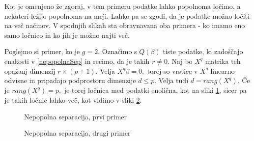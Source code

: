 \documentclass[12pt,a4paper]{amsart}
\theoremstyle{definition} %
\theoremstyle{plain} %
\begin{document}
Kot je omenjeno že zgoraj, v tem primeru podatke lahko popolnoma ločimo, a nekateri ležijo popolnoma na meji. Lahko pa se zgodi, da je podatke možno ločiti na več načinov. V spodnjih
slikah sta obravnavana oba primera - ko imamo eno samo ločnico in ko jih je možno najti več.

Poglejmo si primer, ko je $g=2$. Označimo s $Q(\beta)$ tiste podatke, ki zadoščajo enakosti v \eqref{nepopolnaSep} in recimo, da je takih $r \neq 0$. Naj bo 
$X^{q}$ matrika teh opažanj dimenzij $r\times(p+1).$ Velja $X^{q}\beta=0,$ torej so vrstice v $X^{q}$ linearno odvisne in pripadajo podprostoru dimenzije $d \leq p$.
Velja tudi $d = rang(X^{q}).$ Če je $rang(X^{q}) = p,$ je torej ločnica med podatki enolična, kot na sliki \ref{fig:enolicna}, sicer pa je takih ločnic lahko več, kot vidimo v
sliki \ref{fig:neenolicna}.
\begin{center}
    \begin{figure}[h!]
    \caption{Nepopolna separacija, prvi primer}
    \label{fig:enolicna}
\end{figure}
\end{center}

\begin{center}
    \begin{figure}%
    \caption{Nepopolna separacija, drugi primer}
    \label{fig:neenolicna}
\end{figure}
\end{center}
\pagebreak
\end{document}
